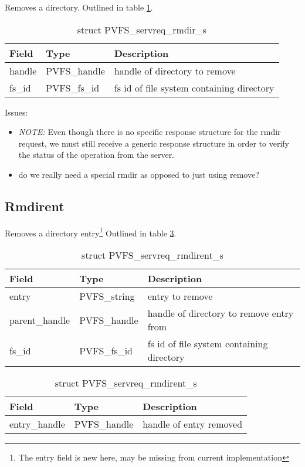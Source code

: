 \documentclass[11pt, letterpaper]{article} %
\begin{document}
Removes a directory.  Outlined in table \ref{tab:reqrmdir}.

\begin{table}[H]
\begin{tabular}{|l|l|l|}
\hline
Field & Type & Description \\
\hline
\hline
handle & PVFS\_handle & handle of directory to remove\\
\hline
fs\_id & PVFS\_fs\_id & fs id of file system containing directory\\
\hline
\end{tabular}
\caption{struct PVFS\_servreq\_rmdir\_s \label{tab:reqrmdir}}
\end{table}

Issues:
\begin{itemize}
\item \emph{NOTE:} Even though there is no specific response structure
for the rmdir request, we must still receive a generic response
structure in order to verify the status of the operation from the server.
\item do we really need a special rmdir as opposed to just using remove?
\end{itemize}

\subsection{Rmdirent}

Removes a directory entry\footnote{The entry field is new here,
may be missing from current implementation} Outlined in table
\ref{tab:reqrmdirent}.

\begin{table}[H]
\begin{tabular}{|l|l|l|}
\hline
Field & Type & Description \\
\hline
\hline
entry & PVFS\_string & entry to remove\\
\hline
parent\_handle & PVFS\_handle & handle of directory to remove entry from\\
\hline
fs\_id & PVFS\_fs\_id & fs id of file system containing directory\\
\hline
\end{tabular}
\caption{struct PVFS\_servreq\_rmdirent\_s \label{tab:reqrmdirent}}
\end{table}

\begin{table}[H]
\begin{tabular}{|l|l|l|}
\hline
Field & Type & Description \\
\hline
\hline
entry\_handle & PVFS\_handle & handle of entry removed\\
\hline
\end{tabular}
\caption{struct PVFS\_servreq\_rmdirent\_s \label{tab:reqrmdirent}}
\end{table}
\end{document}
